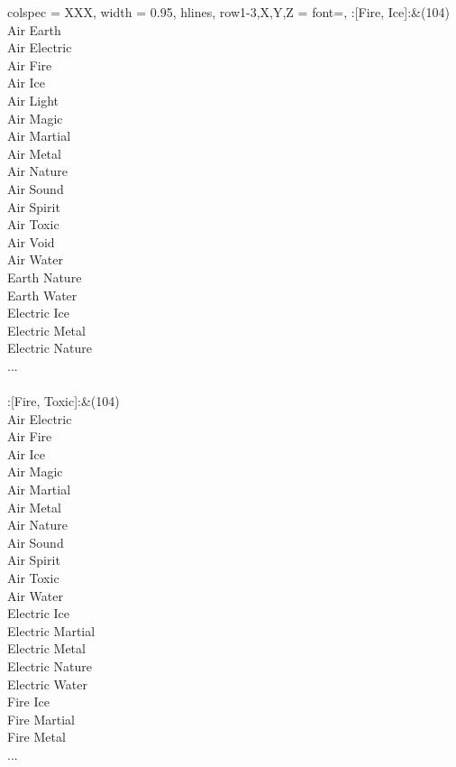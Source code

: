 \begin{longtblr}[
	caption = {2v2 Attacking Effective},
	label = {2v2-Attacking-Effective},
]{
	colspec = {XXX}, width = 0.95\linewidth,
	hlines,
	row{1-3,X,Y,Z} = {font=\bfseries},
}
	:[Fire, Ice]:&{(104)\\
	Air Earth \\
	Air Electric \\
	Air Fire \\
	Air Ice \\
	Air Light \\
	Air Magic \\
	Air Martial \\
	Air Metal \\
	Air Nature \\
	Air Sound \\
	Air Spirit \\
	Air Toxic \\
	Air Void \\
	Air Water \\
	Earth Nature \\
	Earth Water \\
	Electric Ice \\
	Electric Metal \\
	Electric Nature \\
	...\\
	}\\

	:[Fire, Toxic]:&{(104)\\
	Air Electric \\
	Air Fire \\
	Air Ice \\
	Air Magic \\
	Air Martial \\
	Air Metal \\
	Air Nature \\
	Air Sound \\
	Air Spirit \\
	Air Toxic \\
	Air Water \\
	Electric Ice \\
	Electric Martial \\
	Electric Metal \\
	Electric Nature \\
	Electric Water \\
	Fire Ice \\
	Fire Martial \\
	Fire Metal \\
	...\\
	}\\


\end{longtblr}
